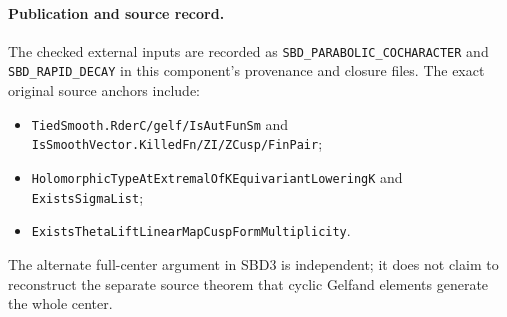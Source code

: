 \documentclass[11pt,a4paper]{article}
\numberwithin{equation}{section}
\theoremstyle{remark}\newtheorem{remark}[theorem]{Remark}
\begin{document}
\paragraph{Publication and source record.}
The checked external inputs are recorded as
\texttt{SBD\_\allowbreak PARABOLIC\_\allowbreak COCHARACTER} and
\texttt{SBD\_\allowbreak RAPID\_\allowbreak DECAY} in this component's provenance and
closure files.  The exact original source anchors include:
\begin{itemize}
\item \texttt{Tied\allowbreak Smooth.\allowbreak Rder\allowbreak C/\allowbreak gelf/\allowbreak Is\allowbreak Aut\allowbreak Fun\allowbreak Sm}
and \texttt{Is\allowbreak Smooth\allowbreak Vector.\allowbreak Killed\allowbreak Fn/\allowbreak ZI/\allowbreak ZCusp/\allowbreak Fin\allowbreak Pair};
\item \texttt{Holomorphic\allowbreak Type\allowbreak At\allowbreak Extremal\allowbreak Of\allowbreak KEquivariant\allowbreak Lowering\allowbreak K}
and \texttt{Exists\allowbreak Sigma\allowbreak List};
\item \texttt{Exists\allowbreak Theta\allowbreak Lift\allowbreak Linear\allowbreak Map\allowbreak Cusp\allowbreak Form\allowbreak Multiplicity}.
\end{itemize}
The alternate full-center argument in SBD3 is independent;
it does not claim to reconstruct the separate source theorem
that cyclic Gelfand elements generate the whole center.
\end{document}
